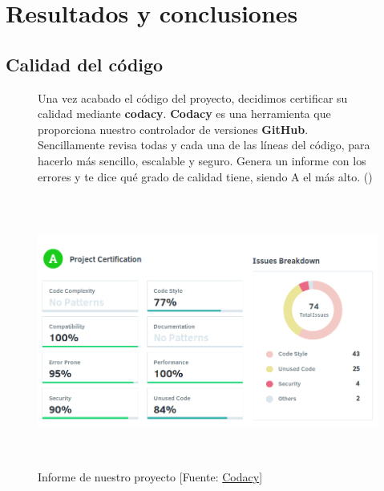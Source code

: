 \cleardoublepage

\chapter{Resultados y conclusiones}
\label{makereference6}


\section{Calidad del código}
\label{makereference6.3}

\begin{figure}[htb]
	Una vez acabado el código del proyecto, decidimos certificar su calidad mediante \textbf{codacy}.
	\textbf{Codacy} es una herramienta que proporciona nuestro controlador de versiones \textbf{GitHub}. Sencillamente revisa todas y cada una de las líneas del código, para hacerlo más sencillo, escalable y seguro. Genera un informe con los errores y te dice qué grado de calidad tiene, siendo A el más alto. (\cite{ARP:Codacy:2017})
	
	\begin{center}
		\includegraphics[height=3.5in]{figures/codacy.png}
		\caption{Informe de nuestro proyecto [Fuente: \href{https://www.codacy.com}{Codacy}]}
	\end{center}
	
	\label{codacy}
\end{figure}
